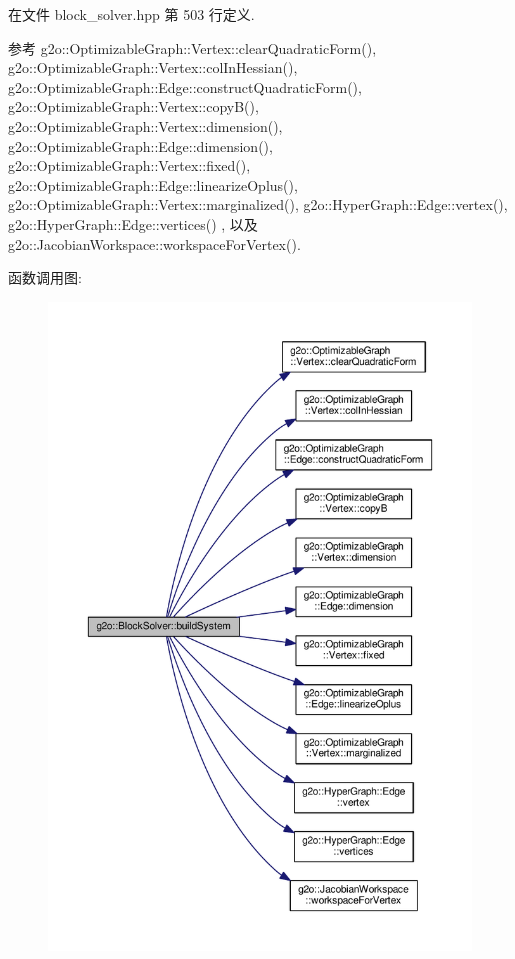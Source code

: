 在文件 block\-\_\-solver.\-hpp 第 503 行定义.



参考 g2o\-::\-Optimizable\-Graph\-::\-Vertex\-::clear\-Quadratic\-Form(), g2o\-::\-Optimizable\-Graph\-::\-Vertex\-::col\-In\-Hessian(), g2o\-::\-Optimizable\-Graph\-::\-Edge\-::construct\-Quadratic\-Form(), g2o\-::\-Optimizable\-Graph\-::\-Vertex\-::copy\-B(), g2o\-::\-Optimizable\-Graph\-::\-Vertex\-::dimension(), g2o\-::\-Optimizable\-Graph\-::\-Edge\-::dimension(), g2o\-::\-Optimizable\-Graph\-::\-Vertex\-::fixed(), g2o\-::\-Optimizable\-Graph\-::\-Edge\-::linearize\-Oplus(), g2o\-::\-Optimizable\-Graph\-::\-Vertex\-::marginalized(), g2o\-::\-Hyper\-Graph\-::\-Edge\-::vertex(), g2o\-::\-Hyper\-Graph\-::\-Edge\-::vertices() , 以及 g2o\-::\-Jacobian\-Workspace\-::workspace\-For\-Vertex().



函数调用图\-:
\nopagebreak
\begin{figure}[H]
\begin{center}
\leavevmode
\includegraphics[width=350pt]{classg2o_1_1BlockSolver_a2654a8d52f38e5ce23720a8de302e2e7_cgraph}
\end{center}
\end{figure}


